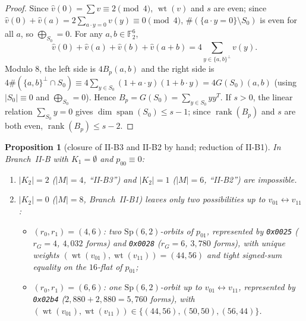 \documentclass[11pt]{article}
\newtheorem{proposition}[theorem]{Proposition}
\theoremstyle{definition}
\theoremstyle{remark}
\newcommand{\F}{\mathbb{F}}
\newcommand{\wt}{\operatorname{wt}}
\newcommand{\rank}{\operatorname{rank}}
\newcommand{\code}[1]{\texttt{#1}}
\DeclareRobustCommand{\_}{\textunderscore\allowbreak}
\begin{document}
\begin{proof}
Since $\widehat v(0)=\sum v\equiv2\pmod 4$, $\wt(v)$ and $s$ are even; since $\widehat v(0)+\widehat v(a)=2\sum_{a\cdot y=0}v(y)\equiv0\pmod 4$, $\#(\{a\cdot y=0\}\setminus S_0)$ is even for all $a$, so $\bigoplus_{S_0}=0$. For any $a,b\in\F_2^6$,
\[
  \widehat v(0)+\widehat v(a)+\widehat v(b)+\widehat v(a+b)=4\sum_{y\in\{a,b\}^\perp}v(y).
\]
Modulo $8$, the left side is $4B_p(a,b)$ and the right side is $4\#(\{a,b\}^\perp\cap S_0)\equiv4\sum_{y\in S_0}(1+a\cdot y)(1+b\cdot y)=4G(S_0)(a,b)$ (using $|S_0|\equiv0$ and $\bigoplus_{S_0}=0$). Hence $B_p=G(S_0)=\sum_{y\in S_0}yy^T$. If $s>0$, the linear relation $\sum_{S_0}y=0$ gives $\dim\operatorname{span}(S_0)\le s-1$; since $\rank(B_p)$ and $s$ are both even, $\rank(B_p)\le s-2$.
\end{proof}

\begin{proposition}[closure of II-B3 and II-B2 by hand; reduction of II-B1]\label{prop:IIB123}
In Branch~II-B with $K_1=\emptyset$ and $p_{00}\equiv0$:
\begin{enumerate}[label=(\alph*),nosep]
\item $|K_2|=2$ ($|M|=4$, ``II-B3'') and $|K_2|=1$ ($|M|=6$, ``II-B2'') are impossible.
\item $|K_2|=0$ ($|M|=8$, Branch~II-B1) leaves only two possibilities up to $v_{01}\leftrightarrow v_{11}$:
  \begin{itemize}[nosep]
  \item $(r_0,r_1)=(4,6)$: two $\mathrm{Sp}(6,2)$-orbits of $p_{01}$, represented by \code{0x0025} ($r_G=4$, $4{,}032$ forms) and \code{0x0028} ($r_G=6$, $3{,}780$ forms), with unique weights $(\wt(v_{01}),\wt(v_{11}))=(44,56)$ and tight signed-sum equality on the $16$-flat of $p_{01}$;
  \item $(r_0,r_1)=(6,6)$: one $\mathrm{Sp}(6,2)$-orbit up to $v_{01}\leftrightarrow v_{11}$, represented by \code{0x02b4} ($2{,}880+2{,}880=5{,}760$ forms), with $(\wt(v_{01}),\wt(v_{11}))\in\{(44,56),(50,50),(56,44)\}$.
  \end{itemize}
\end{enumerate}
\end{proposition}
\end{document}
